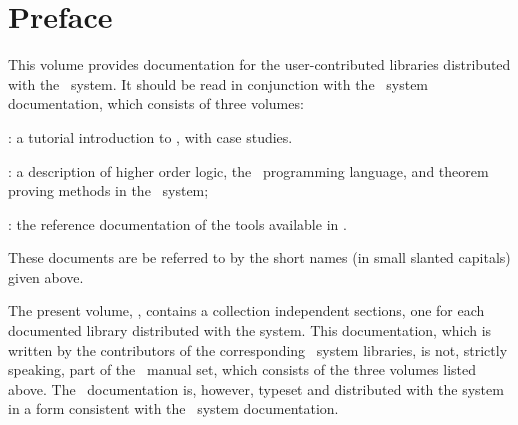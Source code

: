\chapter*{Preface}

This volume provides documentation for the user-contributed libraries
distributed with the \HOL\ system.  It should be read in conjunction with the
\HOL\ system documentation, which consists of three volumes:

\begin{myenumerate}
\item \TUTORIAL: a tutorial introduction to \HOL, with case studies.
\item \DESCRIPTION: a description of higher order logic,
the \ML\ programming language, and theorem proving methods in the \HOL\ system;
\item \REFERENCE: the reference documentation of the tools available in \HOL.
\end{myenumerate}

\noindent These documents are be referred to by the short names (in small
slanted capitals) given above.

The present volume, \LIBRARIES, contains a collection independent sections, one
for each documented library distributed with the system. This documentation,
which is written by the contributors of the corresponding \HOL\ system
libraries, is not, strictly speaking, part of the \HOL\ manual set, which
consists of the three volumes listed above.  The \LIBRARIES\ documentation is,
however, typeset and distributed with the system in a form consistent with the
\HOL\ system documentation.


